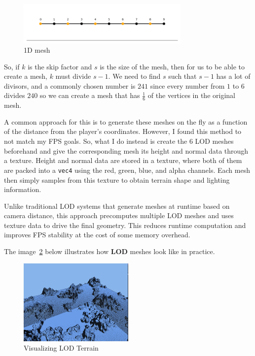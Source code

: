 \begin{figure}[H]
    \centering
    \includegraphics[width=0.75\textwidth]{images/one_d.png}
    \caption{1D mesh}
    \label{fig:one_d}
\end{figure}

So, if $k$ is the skip factor and $s$ is the size of the mesh, then for us to be able to create a mesh, $k$ must divide $s-1$. We need to find $s$ such that $s-1$ has a lot of divisors, and a commonly chosen number is \textbf{$241$} since every number from $1$ to $6$ divides $240$ so we can create a mesh that has $\frac{1}{6}$ of the vertices in the original mesh.

A common approach for this is to generate these meshes on the fly as a function of the distance from the player's coordinates. However, I found this method to not match my FPS goals. So, what I do instead is create the 6 LOD meshes beforehand and give the corresponding mesh its height and normal data through a texture. Height and normal data are stored in a texture, where both of them are packed into a \texttt{vec4} using the red, green, blue, and alpha channels. Each mesh then simply samples from this texture to obtain terrain shape and lighting information.

Unlike traditional LOD systems that generate meshes at runtime based on camera distance, this approach precomputes multiple LOD meshes and uses texture data to drive the final geometry. This reduces runtime computation and improves FPS stability at the cost of some memory overhead.

The image~\ref{fig:lod_terrain} below illustrates how \textbf{LOD} meshes look like in practice.

\begin{figure}[H]
    \centering
    \includegraphics[width=0.5\textwidth]{images/LOD.png}
    \caption{Visualizing LOD Terrain}
    \label{fig:lod_terrain}
\end{figure}

